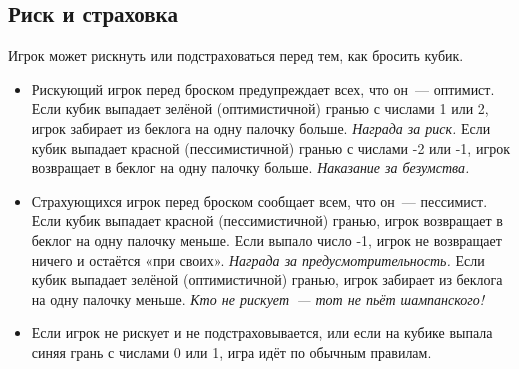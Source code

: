\subsection*{Риск и страховка}

Игрок может рискнуть или подстраховаться перед тем, как бросить кубик.

\begin{itemize}
    \item Рискующий игрок перед броском предупреждает всех, что он — оптимист.
    Если кубик выпадает зелёной (оптимистичной) гранью с числами 1 или 2, игрок забирает из беклога на одну палочку больше.
    \textit{Награда за риск.}
    Если кубик выпадает красной (пессимистичной) гранью с числами -2 или -1, игрок возвращает в беклог на одну палочку больше.
    \textit{Наказание за безумства.}

    \item Страхующихся игрок перед броском сообщает всем, что он — пессимист.
    Если кубик выпадает красной (пессимистичной) гранью, игрок возвращает в беклог на одну палочку меньше.
    Если выпало число -1, игрок не возвращает ничего и остаётся «при своих».
    \textit{Награда за предусмотрительность.}
    Если кубик выпадает зелёной (оптимистичной) гранью, игрок забирает из беклога на одну палочку меньше.
    \textit{Кто не рискует — тот не пьёт шампанского!}

    \item Если игрок не рискует и не подстраховывается, или если на кубике выпала синяя грань с числами 0 или 1, игра идёт по обычным правилам.
\end{itemize}


